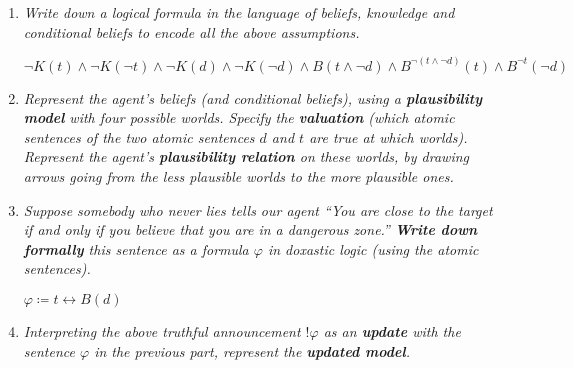 \documentclass[leqno]{article}
\begin{document}
\begin{enumerate}
    \item \textit{Write down a logical formula in the language of beliefs,
    knowledge and conditional beliefs to encode all the above assumptions.}

    $\neg K(t) \land \neg K(\neg t) \land \neg K(d) \land \neg K(\neg d) \land
    B(t \land \neg d) \land B^{\neg (t \land \neg d)}(t) \land
    B^{\neg t}(\neg d)$

    \item \textit{Represent the agent's beliefs (and conditional beliefs),
    using a \textbf{plausibility model} with four possible worlds. Specify the
    \textbf{valuation} (which atomic sentences of the two atomic sentences $d$
    and $t$ are true at which worlds). Represent the agent's
    \textbf{plausibility relation} on these worlds, by drawing arrows going
    from the less plausible worlds to the more plausible ones.}

    \begin{center}
    \end{center}

    \item \textit{Suppose somebody who never lies tells our agent ``You are
    close to the target if and only if you believe that you are in a dangerous
    zone.'' \textbf{Write down formally} this sentence as a formula $\varphi$
    in doxastic logic (using the atomic sentences).}

    $\varphi \coloneqq t \leftrightarrow B(d)$

    \item \textit{Interpreting the above truthful announcement $!\varphi$ as an
     \textbf{update} with the sentence $\varphi$ in the previous part,
    represent the \textbf{updated model}.}


\end{enumerate}
\end{document}
